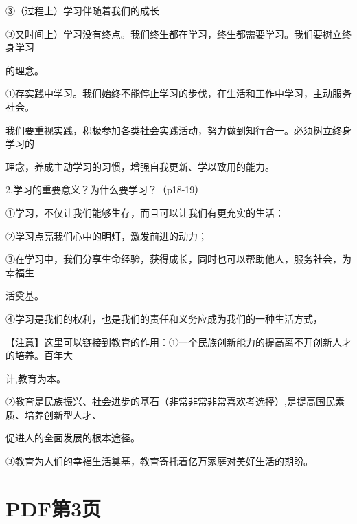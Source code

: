 \documentclass[lang=cn,11pt]{elegantbook}
\newcommand{\daofasym}[1]{{\daofasymbolfont #1}}
\newcommand{\daofasym}[1]{#1}
\begin{document}
\daofasym{③}（过程上）学习伴随着我们的成长\par

\daofasym{③}又时间上）学习没有终点。我们终生都在学习，终生都需要学习。我们要树立终身学习\par

的理念。\par

\daofasym{①}存实践中学习。我们始终不能停止学习的步伐，在生活和工作中学习，主动服务社会。\par

我们要重视实践，积极参加各类社会实践活动，努力做到知行合一。必须树立终身学习的\par

理念，养成主动学习的习惯，增强自我更新、学以致用的能力。\par

2.学习的重要意义？为什么要学习？（p18-19）\par

\daofasym{①}学习，不仅让我们能够生存，而且可以让我们有更充实的生活：\par

\daofasym{②}学习点亮我们心中的明灯，激发前进的动力；\par

\daofasym{③}在学习中，我们分享生命经验，获得成长，同时也可以帮助他人，服务社会，为幸福生\par

活奠基。\par

\daofasym{④}学习是我们的权利，也是我们的责任和义务应成为我们的一种生活方式，\par

【注意】这里可以链接到教育的作用：\daofasym{①}一个民族创新能力的提高离不开创新人才的培养。百年大\par

计,教育为本。\par

\daofasym{②}教育是民族振兴、社会进步的基石（非常非常非常喜欢考选择）,是提高国民素质、培养创新型人才、\par

促进人的全面发展的根本途径。\par

\daofasym{③}教育为人们的幸福生活奠基，教育寄托着亿万家庭对美好生活的期盼。\par


\section*{PDF第3页}
\end{document}
